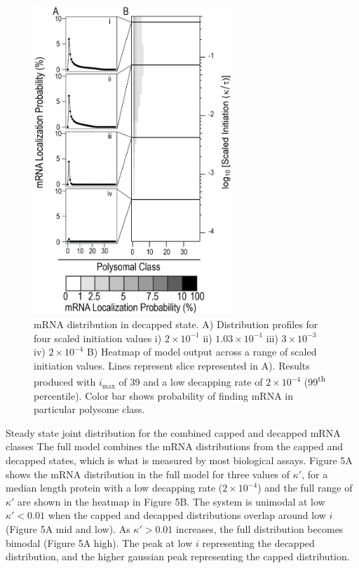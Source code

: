 \documentclass[a4,center,fleqn]{NAR}
\newcommand{\imax}{\ensuremath{{i_{\max}}}\xspace}
\begin{document}
\begin{figure}[!ht]
\begin{center}
\includegraphics[width=75mm]{Images/2023-07-04_Marked_slices.png}
\caption{mRNA distribution in decapped state. A) Distribution profiles for four scaled initiation values i) $2\times 10^{-1}$ ii) $1.03\times 10^{-1}$ iii) $3\times 10^{-3}$ iv) $2\times 10^{-4}$ B) Heatmap of model output across a range of scaled initiation values. Lines represent slice represented in A). Results produced with \imax of 39 and a low decapping rate of $2\times10^{-4}$  (99\textsuperscript{th} percentile). Color bar shows probability of finding mRNA in particular polysome class.}
\end{center}
\end{figure}


Steady state joint distribution for the combined capped and decapped mRNA classes
The full model combines the mRNA distributions from the capped and decapped states, which is what is measured by most biological assays.
Figure 5A shows the mRNA distribution in the full model for three values of $\kappa'$, for a median length protein with a low decapping rate ($2\times10^{-4}$) and the full range of $\kappa'$ are shown in the heatmap in Figure 5B.
The system is unimodal at low $\kappa'<0.01$ when the capped and decapped distributions overlap around low $i$ (Figure 5A mid and low). 
As $\kappa'>0.01$ increases, the full distribution becomes bimodal (Figure 5A high).
The peak at low $i$ representing the decapped distribution, and the higher gaussian peak representing the capped distribution. 
\end{document}

